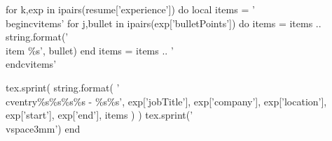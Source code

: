 

\begin{cventries}




  \begin{luacode}
    for k,exp in ipairs(resume['experience']) do
      local items = '\\begin{cvitems}'
      for j,bullet in ipairs(exp['bulletPoints']) do
        items = items .. string.format('\\item {\%s}', bullet)
      end
      items = items .. '\\end{cvitems}'

      tex.sprint(
        string.format(
          '\\cventry{\%s}{\%s}{\%s}{\%s - \%s}{\%s}',
          exp['jobTitle'],
          exp['company'],
          exp['location'],
          exp['start'],
          exp['end'],
          items
        )
      )
      tex.sprint('\\vspace{3mm}')
    end
  \end{luacode}


\end{cventries}
